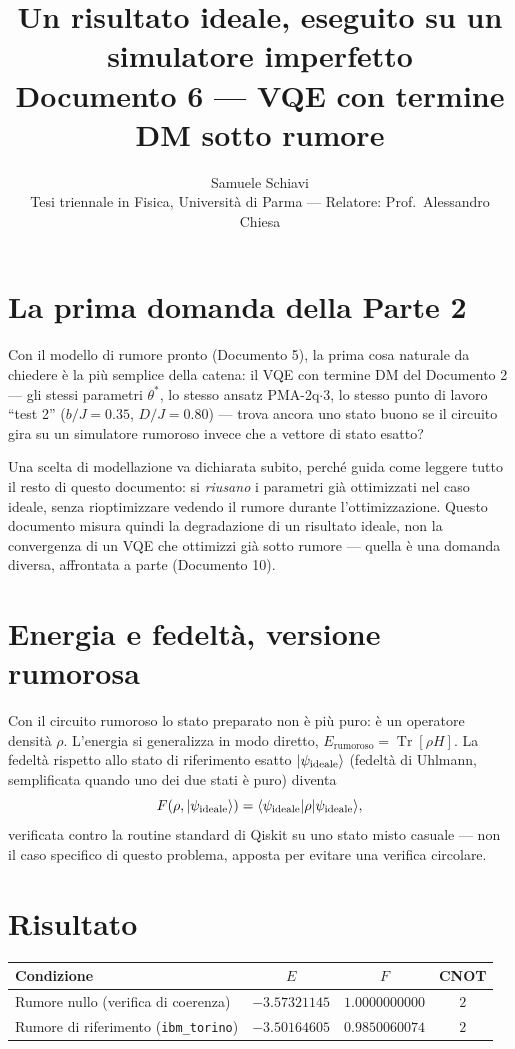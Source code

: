 \documentclass[11pt,a4paper]{article}
\title{\bfseries Un risultato ideale, eseguito su un simulatore imperfetto\\[2pt]
\large Documento 6 --- VQE con termine DM sotto rumore}
\author{Samuele Schiavi \\ \small Tesi triennale in Fisica, Università di Parma
--- Relatore: Prof.\ Alessandro Chiesa}
\date{}
\newcommand{\Tr}{\operatorname{Tr}}
\begin{document}
\maketitle
\thispagestyle{fancy}

\section{La prima domanda della Parte 2}

Con il modello di rumore pronto (Documento 5), la prima cosa naturale da
chiedere è la più semplice della catena: il VQE con termine DM del Documento
2 --- gli stessi parametri $\theta^*$, lo stesso ansatz PMA-2q$\cdot$3, lo
stesso punto di lavoro ``test 2'' ($b/J=0.35$, $D/J=0.80$) --- trova ancora
uno stato buono se il circuito gira su un simulatore rumoroso invece che a
vettore di stato esatto?

Una scelta di modellazione va dichiarata subito, perché guida come leggere
tutto il resto di questo documento: si \emph{riusano} i parametri già
ottimizzati nel caso ideale, senza rioptimizzare vedendo il rumore durante
l'ottimizzazione. Questo documento misura quindi la degradazione di un
risultato ideale, non la convergenza di un VQE che ottimizzi già sotto
rumore --- quella è una domanda diversa, affrontata a parte (Documento 10).

\section{Energia e fedeltà, versione rumorosa}

Con il circuito rumoroso lo stato preparato non è più puro: è un operatore
densità $\rho$. L'energia si generalizza in modo diretto,
$E_\text{rumoroso}=\Tr[\rho H]$. La fedeltà rispetto allo stato di riferimento
esatto $\lvert \psi_\text{ideale}\rangle$ (fedeltà di Uhlmann, semplificata quando uno
dei due stati è puro) diventa
\begin{equation}
F(\rho,\lvert \psi_\text{ideale}\rangle) = \langle \psi_\text{ideale} \rvert\rho\lvert \psi_\text{ideale}\rangle,
\end{equation}
verificata contro la routine standard di Qiskit su uno stato misto casuale ---
non il caso specifico di questo problema, apposta per evitare una verifica
circolare.

\section{Risultato}

\begin{center}
\renewcommand{\arraystretch}{1.3}
\begin{tabular}{@{}lccc@{}}
\toprule
\textbf{Condizione} & $E$ & $F$ & CNOT\\
\midrule
Rumore nullo (verifica di coerenza) & $-3.57321145$ & $1.0000000000$ & $2$\\
Rumore di riferimento (\texttt{ibm\_torino}) & $-3.50164605$ & $0.9850060074$ & $2$\\
\bottomrule
\end{tabular}
\end{center}
\end{document}
